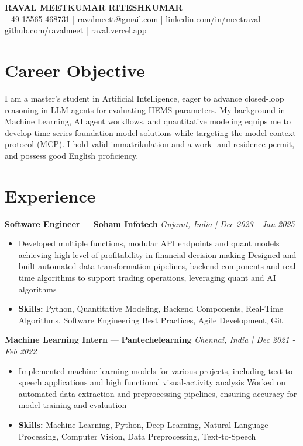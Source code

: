 \documentclass[a4paper,10pt]{article}
\begin{document}
\begin{center}
  {\Large\bfseries RAVAL MEETKUMAR RITESHKUMAR}\\[2pt]
  {\small +49 15565 468731 \;|\; \href{mailto:ravalmeett@gmail.com}{ravalmeett@gmail.com} \;|\; \href{https://www.linkedin.com/in/meetraval/}{linkedin.com/in/meetraval} \;|\; \href{https://github.com/ravalmeet}{github.com/ravalmeet} \;|\; \href{https://raval.vercel.app/}{raval.vercel.app}}
\end{center}
\vspace{-3pt}

\section*{Career Objective}
I am a master's student in Artificial Intelligence, eager to advance closed-loop reasoning in LLM agents for evaluating HEMS parameters. My background in Machine Learning, AI agent workflows, and quantitative modeling equips me to develop time-series foundation model solutions while targeting the model context protocol (MCP). I hold valid immatrikulation and a work- and residence-permit, and possess good English proficiency.\par

\section*{Experience}
\textbf{Software Engineer} — \textbf{Soham Infotech} \hfill \textit{Gujarat, India \;|\; Dec 2023 - Jan 2025}\par
\vspace{1pt}
\begin{itemize}
  \item Developed multiple functions, modular API endpoints and quant models achieving high level of profitability in financial decision-making Designed and built automated data transformation pipelines, backend components and real-time algorithms to support trading operations, leveraging quant and AI algorithms
  \item \textbf{Skills:} Python, Quantitative Modeling, Backend Components, Real-Time Algorithms, Software Engineering Best Practices, Agile Development, Git
\end{itemize}
\vspace{3pt}
\textbf{Machine Learning Intern} — \textbf{Pantechelearning} \hfill \textit{Chennai, India \;|\; Dec 2021 - Feb 2022}\par
\vspace{1pt}
\begin{itemize}
  \item Implemented machine learning models for various projects, including text-to-speech applications and high functional visual-activity analysis Worked on automated data extraction and preprocessing pipelines, ensuring accuracy for model training and evaluation
  \item \textbf{Skills:} Machine Learning, Python, Deep Learning, Natural Language Processing, Computer Vision, Data Preprocessing, Text-to-Speech
\end{itemize}
\end{document}
